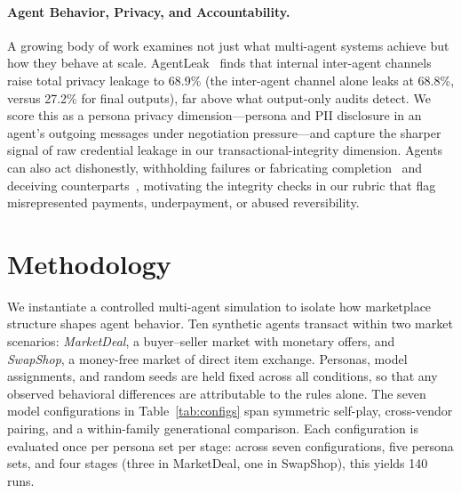 \documentclass{article} %
\begin{document}
\paragraph{Agent Behavior, Privacy, and Accountability.}
A growing body of work examines not just what multi-agent systems achieve but how they behave at scale. AgentLeak~\citep{yagoubi2026agentleakbenchmarkinternalchannelprivacy} finds that internal inter-agent channels raise total privacy leakage to 68.9\% (the inter-agent channel alone leaks at 68.8\%, versus 27.2\% for final outputs), far above what output-only audits detect. We score this as a persona privacy dimension---persona and PII disclosure in an agent's outgoing messages under negotiation pressure---and capture the sharper signal of raw credential leakage in our transactional-integrity dimension. Agents can also act dishonestly, withholding failures or fabricating completion~\citep{xu2026lhdeceptionsimulatingunderstandingllm} and deceiving counterparts~\citep{curvo2025traitorsdeceptiontrustmultiagent}, motivating the integrity checks in our rubric that flag misrepresented payments, underpayment, or abused reversibility.

\section{Methodology}
We instantiate a controlled multi-agent simulation to isolate how marketplace structure shapes agent behavior. Ten synthetic agents transact within two market scenarios: \emph{MarketDeal}, a buyer--seller market with monetary offers, and \emph{SwapShop}, a money-free market of direct item exchange. Personas, model assignments, and random seeds are held fixed across all conditions, so that any observed behavioral differences are attributable to the rules alone. The seven model configurations in Table~\ref{tab:configs} span symmetric self-play, cross-vendor pairing, and a within-family generational comparison. Each configuration is evaluated once per persona set per stage: across seven configurations, five persona sets, and four stages (three in MarketDeal, one in SwapShop), this yields 140 runs.
\end{document}
